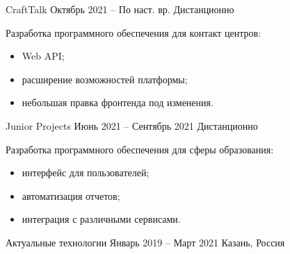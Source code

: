 \documentclass[10pt,a4paper,ragged2e,withhyper]{altacv}
\begin{document}

\makecvheader



\begin{paracol}{2}


{CraftTalk}
{Октябрь 2021 -- По наст. вр.}
{Дистанционно}

Разработка программного обеспечения для контакт центров:

\begin{itemize}

  \item Web API;
  \smallskip

  \item расширение возможностей платформы;
  \smallskip

  \item небольшая правка фронтенда под изменения.

\end{itemize}

\divider

{Junior Projects}
{Июнь 2021 -- Сентябрь 2021}
{Дистанционно}

Разработка программного обеспечения для сферы образования:

\begin{itemize}

  \item интерфейс для пользователей;
  \smallskip

  \item автоматизация отчетов;
  \smallskip

  \item интеграция с различными сервисами.

\end{itemize}

\divider

{Актуальные технологии}
{Январь 2019 -- Март 2021}
{Казань, Россия}


\end{paracol}
\end{document}
